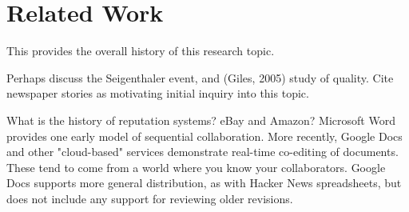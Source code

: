 \section{Related Work}

This provides the overall history of this
research topic.

Perhaps discuss the Seigenthaler event,
and (Giles, 2005) study of quality.
Cite newspaper stories as motivating initial inquiry into this topic.

What is the history of reputation systems?  eBay and Amazon?
Microsoft Word provides one early model of sequential collaboration.
More recently, Google Docs and other "cloud-based" services
demonstrate real-time co-editing of documents.
These tend to come from a world where you know your collaborators.
Google Docs supports more general distribution, as with
Hacker News spreadsheets, but does not include any support for
reviewing older revisions.

